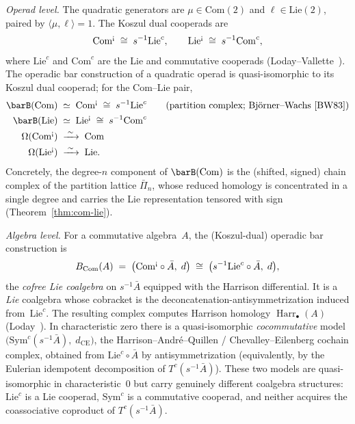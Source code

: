 \begin{example}
\label{ex:com-lie-prototype}
\emph{Operad level.} The quadratic generators are
$\mu \in \mathrm{Com}(2)$ and $\ell \in \mathrm{Lie}(2)$, paired
by $\langle \mu, \ell \rangle = 1$. The Koszul dual cooperads
are
\[
\mathrm{Com}^{\text{\textexclamdown}}
\;\cong\; s^{-1}\mathrm{Lie}^c,
\qquad
\mathrm{Lie}^{\text{\textexclamdown}}
\;\cong\; s^{-1}\mathrm{Com}^c,
\]
where $\mathrm{Lie}^c$ and $\mathrm{Com}^c$ are the Lie and
commutative cooperads
(Loday--Vallette~\cite[\S13.1.4, \S13.1.5]{LV12}). The operadic
bar construction of a quadratic operad is quasi-isomorphic to its
Koszul dual cooperad; for the Com--Lie pair,
\begin{align*}
\barB(\mathrm{Com}) &\;\simeq\; \mathrm{Com}^{\text{\textexclamdown}}
 \;\cong\; s^{-1}\mathrm{Lie}^c
 \qquad\text{(partition complex; Björner--Wachs \cite{BW83})} \\
\barB(\mathrm{Lie}) &\;\simeq\; \mathrm{Lie}^{\text{\textexclamdown}}
 \;\cong\; s^{-1}\mathrm{Com}^c \\
\Omega(\mathrm{Com}^{\text{\textexclamdown}})
 &\;\xrightarrow{\;\sim\;}\; \mathrm{Com} \\
\Omega(\mathrm{Lie}^{\text{\textexclamdown}})
 &\;\xrightarrow{\;\sim\;}\; \mathrm{Lie}.
\end{align*}
Concretely, the degree-$n$ component of $\barB(\mathrm{Com})$ is
the (shifted, signed) chain complex of the partition lattice
$\bar\Pi_n$, whose reduced homology is concentrated in a single
degree and carries the Lie representation tensored with sign
(Theorem~\ref{thm:com-lie}).

\emph{Algebra level.} For a commutative algebra~$A$, the
(Koszul-dual) operadic bar construction is
\[
B_{\mathrm{Com}}(A)
\;=\;
\bigl(\mathrm{Com}^{\text{\textexclamdown}} \circ \bar{A},\; d\bigr)
\;\cong\;
\bigl(s^{-1}\mathrm{Lie}^c \circ \bar{A},\; d\bigr),
\]
the \emph{cofree Lie coalgebra} on $s^{-1}\bar{A}$ equipped with
the Harrison differential. It is a \emph{Lie} coalgebra whose cobracket is the
deconcatenation-antisymmetrization induced from~$\mathrm{Lie}^c$.
The resulting complex computes Harrison homology
$\operatorname{Harr}_\bullet(A)$
(Loday~\cite[\S4.2]{Loday98}). In characteristic zero there is a
quasi-isomorphic \emph{cocommutative} model
$\bigl(\mathrm{Sym}^c(s^{-1}\bar{A}),\; d_{\mathrm{CE}}\bigr)$,
the Harrison--André--Quillen / Chevalley--Eilenberg cochain
complex, obtained from $\mathrm{Lie}^c \circ \bar{A}$ by
antisymmetrization (equivalently, by the Eulerian idempotent
decomposition of $T^c(s^{-1}\bar{A})$). These two models are
quasi-isomorphic in characteristic~$0$ but carry genuinely
different coalgebra structures: $\mathrm{Lie}^c$ is a Lie
cooperad, $\mathrm{Sym}^c$ is a commutative cooperad, and
neither acquires the coassociative coproduct of
$T^c(s^{-1}\bar A)$.


\end{example}

